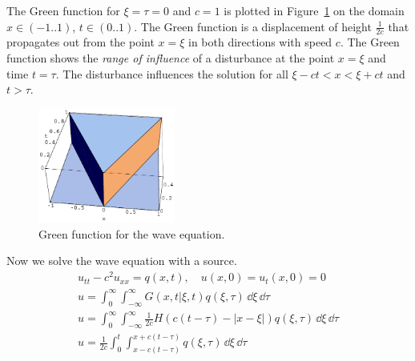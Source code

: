 {\begin{Solution}
  The Green function for $\xi = \tau = 0$ and $c = 1$ is plotted in 
  Figure~\ref{green_wave_mii} on the 
  domain $x \in (-1..1)$, $t \in (0..1)$.  The Green function is a displacement
  of height $\frac{1}{2c}$ that propagates out from the point $x = \xi$ in
  both directions with speed $c$.  The Green function shows the 
  \textit{range of influence} of a disturbance at the point $x = \xi$ and time
  $t = \tau$.  The disturbance influences the solution for all 
  $\xi - c t < x < \xi + c t$ and $t > \tau$.
  \begin{figure}[h!]
    \begin{center}
      \includegraphics[width=0.4\textwidth]{pde/green/green_wave_mii}
    \end{center}
    \caption{Green function for the wave equation.}
    \label{green_wave_mii}
  \end{figure}

  Now we solve the wave equation with a source.
  \begin{gather*}
    u_{t t} - c^2 u_{x x} = q(x,t), \quad u(x,0) = u_t(x,0) = 0
    \\
    u = \int_0^\infty \int_{-\infty}^\infty G(x,t|\xi,t) q(\xi,\tau) \,\dd \xi \,\dd \tau
    \\
    u = \int_0^\infty \int_{-\infty}^\infty  \frac{1}{2c} H(c (t-\tau) - |x - \xi| ) q(\xi,\tau) \,\dd \xi \,\dd \tau
    \\
    \boxed{
      u = \frac{1}{2c} \int_0^t \int_{x - c (t-\tau)}^{x + c (t-\tau)} q(\xi,\tau) \,\dd \xi \,\dd \tau
      }
  \end{gather*}
\end{Solution}









}
